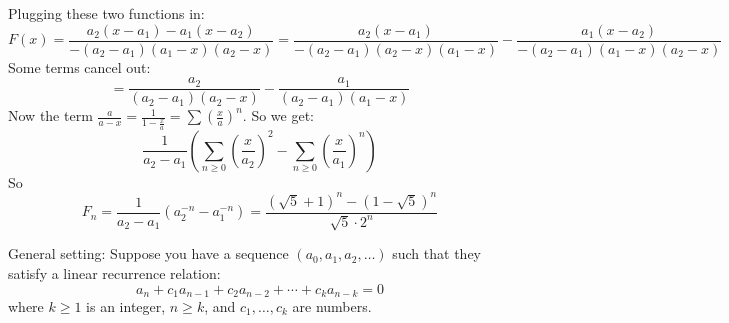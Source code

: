 \documentclass{report}
\begin{document}
Plugging these two functions in:
    \begin{equation*}
        F(x) = \dfrac{a_{2}(x - a_{1}) - a_{1}(x - a_{2})}{-(a_{2} - a_{1})(a_{1} - x)(a_{2} - x)} = \dfrac{a_{2}(x - a_{1})}{-(a_{2} - a_{1})(a_{2} - x)(a_{1} - x)} - \dfrac{a_{1}(x - a_{2})}{-(a_{2} - a_{1})(a_{1} - x)(a_{2} - x)}
    \end{equation*}
Some terms cancel out:
    \begin{equation*}
        = \dfrac{a_{2}}{(a_{2} - a_{1})(a_{2} - x)} - \dfrac{a_{1}}{(a_{2} - a_{1})(a_{1} - x)}
    \end{equation*}
Now the term $\frac{a}{a - x} = \frac{1}{ 1 - \frac{x}{a}} = \sum(\frac{x}{a})^{n}$. So we get:
    \begin{equation*}
        \dfrac{1}{a_{2} - a_{1}}\left(\sum_{n \geq 0}\left(\dfrac{x}{a_{2}}\right)^{2} - \sum_{n \geq 0}\left(\dfrac{x}{a_{1}}\right)^{n}\right)
    \end{equation*}
So 
    \begin{equation*}
        F_{n} = \dfrac{1}{a_{2} - a_{1}}\left(a_{2}^{-n} - a_{1}^{-n}\right) = \dfrac{(\sqrt{5} + 1)^{n} - (1 - \sqrt{5})^{n}}{\sqrt{5} \cdot 2^{n}}
    \end{equation*}

General setting: Suppose you have a sequence $(a_{0}, a_{1}, a_{2}, \ldots )$ such that they satisfy a linear recurrence relation:
    \begin{equation*}
        a_{n} + c_{1}a_{n - 1} + c_{2}a_{n - 2} + \cdots + c_{k}a_{n - k} = 0
    \end{equation*}
where $k \geq 1$ is an integer, $n \geq k$, and $c_{1}, \ldots , c_{k}$ are numbers.
\end{document}
